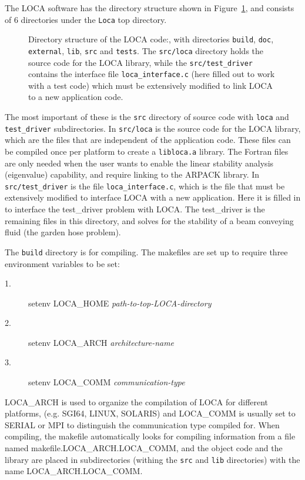 The LOCA software has the directory structure shown in Figure~\ref{fig:dir}, and
consists of $6$ directories under the \texttt{Loca} top directory.
\begin{figure}
\caption{Directory structure of the LOCA code:, with directories \texttt{build}, \texttt{doc}, \texttt{external}, \texttt{lib}, \texttt{src} and \texttt{tests}. The \texttt{src/loca} directory holds the source code for the LOCA library, while the \texttt{src/test\_driver} contains the interface file \texttt{loca\_interface.c} (here filled out to work with a test code) which must be extensively modified to link LOCA to a new application code.}
\label{fig:dir}
\end{figure}
The most important of these is the \texttt{src} directory of source code with \texttt{loca} and \texttt{test\_driver} subdirectories. In \texttt{src/loca}
is the source code for the LOCA library, which are the files that are independent
of the application code. These files can be compiled once per platform to create a \texttt{libloca.a} library. The Fortran files are only needed when the user wants to enable the linear stability analysis (eigenvalue) capability, and require linking to the ARPACK library. In \texttt{src/test\_driver} is the file \texttt{loca\_interface.c}, which is the file that must be extensively modified to interface LOCA with a new application. Here it
is filled in to interface the test\_driver problem with LOCA. The test\_driver is
the remaining files in this directory, and solves for the stability of a beam conveying fluid (the garden hose problem). 

The \texttt{build} directory is for compiling. The makefiles are set up to require three environment variables to be set:
\begin{description}
\item[1.] setenv LOCA\_HOME {\sl path-to-top-LOCA-directory}
\item[2.] setenv LOCA\_ARCH {\sl architecture-name}
\item[3.] setenv LOCA\_COMM {\sl communication-type}
\end{description}
LOCA\_ARCH is used to organize the compilation of LOCA for different platforms, (e.g. SGI64, LINUX, SOLARIS) and LOCA\_COMM is usually set to
SERIAL or MPI to distinguish the communication type compiled for. When compiling, 
the makefile automatically looks for compiling information from a file named
makefile.LOCA\_ARCH.LOCA\_COMM, and the
object code and the library are placed in subdirectories (withing the \texttt{src} and \texttt{lib} directories) with the name LOCA\_ARCH.LOCA\_COMM. 

